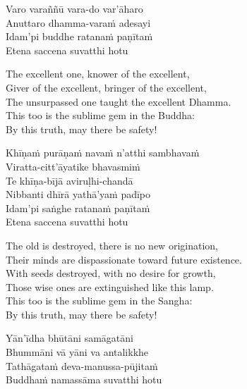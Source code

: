 \begin{pali-hang-continued}
  Varo varaññū vara-do var'āharo\\
  Anuttaro dhamma-varaṁ adesayi\\
  Idam'pi buddhe ratanaṁ paṇītaṁ\\
  Etena saccena suvatthi hotu
\end{pali-hang-continued}

\begin{english-verses}
  The excellent one, knower of the excellent,\\
  Giver of the excellent, bringer of the excellent,\\
  The unsurpassed one taught the excellent Dhamma.\\
  This too is the sublime gem in the Buddha:\\
  By this truth, may there be safety!
\end{english-verses}

\begin{pali-hang-continued}
  Khīṇaṁ purāṇaṁ navaṁ n'atthi sambhavaṁ\\
  Viratta-citt'āyatike bhavasmiṁ\\
  Te khīṇa-bījā aviruḷhi-chandā\\
  Nibbanti dhīrā yathā'yaṁ padīpo\\
  Idam'pi saṅghe ratanaṁ paṇītaṁ\\
  Etena saccena suvatthi hotu
\end{pali-hang-continued}

\begin{english-verses}
  The old is destroyed, there is no new origination,\\
  Their minds are dispassionate toward future existence.\\
  With seeds destroyed, with no desire for growth,\\
  Those wise ones are extinguished like this lamp.\\
  This too is the sublime gem in the Sangha:\\
  By this truth, may there be safety!
\end{english-verses}

\begin{pali-hang-continued}
  Yān'īdha bhūtāni samāgatāni\\
  Bhummāni vā yāni va antalikkhe\\
  Tathāgataṁ deva-manussa-pūjitaṁ\\
  Buddhaṁ namassāma suvatthi hotu
\end{pali-hang-continued}

